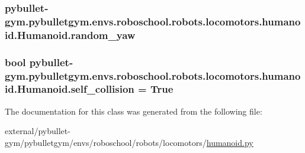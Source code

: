\subsubsection[{\texorpdfstring{random\+\_\+yaw}{random_yaw}}]{\setlength{\rightskip}{0pt plus 5cm}pybullet-\/gym.\+pybulletgym.\+envs.\+roboschool.\+robots.\+locomotors.\+humanoid.\+Humanoid.\+random\+\_\+yaw}\hypertarget{classpybullet-gym_1_1pybulletgym_1_1envs_1_1roboschool_1_1robots_1_1locomotors_1_1humanoid_1_1_humanoid_a86299da21924ea1145a77f7fd25c10c2}{}\label{classpybullet-gym_1_1pybulletgym_1_1envs_1_1roboschool_1_1robots_1_1locomotors_1_1humanoid_1_1_humanoid_a86299da21924ea1145a77f7fd25c10c2}
\subsubsection[{\texorpdfstring{self\+\_\+collision}{self_collision}}]{\setlength{\rightskip}{0pt plus 5cm}bool pybullet-\/gym.\+pybulletgym.\+envs.\+roboschool.\+robots.\+locomotors.\+humanoid.\+Humanoid.\+self\+\_\+collision = True\hspace{0.3cm}{\ttfamily [static]}}\hypertarget{classpybullet-gym_1_1pybulletgym_1_1envs_1_1roboschool_1_1robots_1_1locomotors_1_1humanoid_1_1_humanoid_a703bf43f674b3f7490c5425385d57fb0}{}\label{classpybullet-gym_1_1pybulletgym_1_1envs_1_1roboschool_1_1robots_1_1locomotors_1_1humanoid_1_1_humanoid_a703bf43f674b3f7490c5425385d57fb0}


The documentation for this class was generated from the following file\+:\begin{DoxyCompactItemize}
\item 
external/pybullet-\/gym/pybulletgym/envs/roboschool/robots/locomotors/\hyperlink{roboschool_2robots_2locomotors_2humanoid_8py}{humanoid.\+py}\end{DoxyCompactItemize}
